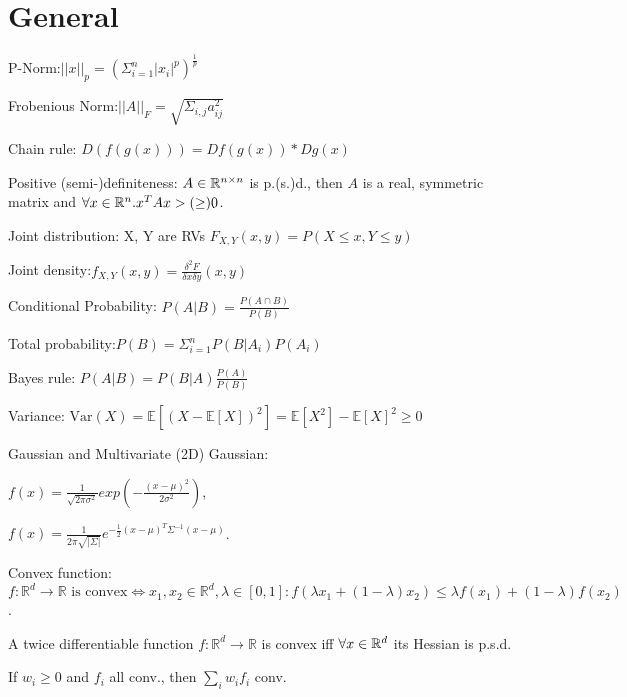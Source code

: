 \section{General}
P-Norm:$||x||_p = (\Sigma_{i=1}^n |x_i|^p)^{\frac{1}{p}}$

Frobenious Norm:$||A||_F = \sqrt{\Sigma_{i,j} a_{ij}^2}$

Chain rule: $D(f(g(x))) = Df(g(x))*Dg(x)$

Positive (semi-)definiteness: $A \in \mathbb{R}^{n \times n}$ is p.(s.)d., then $A$ is a real, symmetric matrix and $\forall x \in \mathbb{R}^n . x^TAx > (\geq) 0 $.

Joint distribution: X, Y are RVs $F_{X,Y}(x,y) = P(X \leq x, Y\leq y)$

Joint density:$ f_{X,Y}(x, y) = \frac{\delta^2 F}{\delta x \delta y}(x, y)$

Conditional Probability: $P(A|B) = \frac{P(A \cap B)}{P(B)}$

Total probability:$P(B) = \Sigma_{i=1}^n P(B|A_i)P(A_i)$

Bayes rule: $P(A|B) = P(B|A)\frac{P(A)}{P(B)}$

Variance: $\text{Var}(X) = \mathbb{E}[(X - \mathbb{E}[X])^2] = \mathbb{E}[X^2] - \mathbb{E}[X]^2 \geq 0$

Gaussian and Multivariate (2D) Gaussian: 

$f(x) = \frac{1}{\sqrt{2\pi\sigma^2}} exp(-\frac{(x-\mu)^2}{2\sigma^2})$,

$f(x) = \frac{1}{2\pi \sqrt{|\Sigma|}} e^{- \frac{1}{2} (x-\mu)^T \Sigma^{-1} (x-\mu)}$.

Convex function: $f : \mathbb{R}^d \rightarrow \mathbb{R} \text{ is convex} \Leftrightarrow x_1,x_2 \in \mathbb{R}^d, \lambda \in [0,1]: f(\lambda x_1 + (1-\lambda) x_2) \leq \lambda f(x_1) + (1-\lambda) f(x_2)$.

A twice differentiable function $f: \mathbb{R}^d \rightarrow \mathbb{R}$ is convex iff $\forall x \in \mathbb{R}^d$ its Hessian is p.s.d.

If $w_i \geq 0$ and $f_i$ all conv., then $\sum_i w_i f_i$ conv.